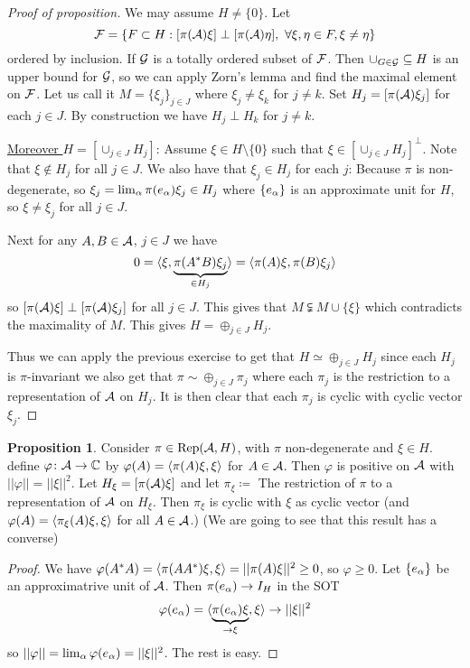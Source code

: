\documentclass[10pt,english,a4paper]{article}
\theoremstyle{definition}
\newtheorem*{proposition}{Proposition}
\DeclareMathOperator{\Rep}{Rep}
\def\vphi{\varphi}
\begin{document}
\begin{proof}[Proof of proposition]
    We may assume $H\neq \{0\}$. Let 
\[ \mathcal{F} = \{ F\subset H : [\pi(\mathcal{A})\xi] \perp [\pi(\mathcal{A})\eta], ~\forall \xi,\eta \in F, \xi\neq \eta\} \]
ordered by inclusion. If $\mathcal{G}$ is a totally ordered subset of $\mathcal{F}$. Then 
$\cup_{G \in \mathcal{G}} \subseteq H$ is an upper bound for $\mathcal{G}$, so we can apply 
Zorn's lemma and find the maximal element on $\mathcal{F}$. Let us call it 
$M  = \{\xi_j\}_{j\in J}$ where $\xi_j\neq \xi_k$ for $j\neq k$. Set
$H_j =[\pi(\mathcal{A})\xi_j]$ for each $j\in J$. By construction we have 
$H_j \perp H_k$ for $j\neq k$. 

\ul{Moreover $H = [\cup_{j\in J}H_j]$}: Assume $\xi \in H\setminus \{0\}$ such that 
$\xi \in [\cup_{j\in J}H_j]^{\perp}$. Note that $\xi \not\in H_j$ for all $j\in J$.
We also have that $\xi_j \in H_j$ for each $j$: Because $\pi$ is non-degenerate, so 
$\xi_j = \lim_{\alpha}\pi(e_{\alpha})\xi_j \in H_j$ where $\{e_{\alpha}\}$ is an approximate
unit for $H$, so $\xi\neq \xi_j$ for all $j\in J$.

Next for any $A,B \in \mathcal{A}$, $j\in J$ we have 
\[ 0 = \langle \xi,\underbrace{\pi(A^*B)\xi_j}_{\in H_j} \rangle = \left\langle \pi(A)\xi,\pi(B)\xi_j \right\rangle  \] 
so
$[\pi(\mathcal{A})\xi]\perp [\pi(\mathcal{A})\xi_j]$ for all $j\in J$. This gives that $M
\subsetneqq M \cup \{\xi\}$ which contradicts the maximality of $M$. This gives 
$H = \oplus_{j\in J} H_j$. 

Thus we
can apply the previous exercise to get that $H \simeq \oplus_{j\in J} H_j$
since each $H_j$ is $\pi$-invariant we also get that $\pi\sim \oplus_{j\in J}
\pi_j$ where each $\pi_j$ is the restriction to a representation of $\mathcal{A}$ on
$H_j$. It is then clear that each $\pi_j$ is cyclic with cyclic vector $\xi_j$.
\end{proof}

\begin{proposition}
    Consider $\pi \in \Rep(\As,H)$, with $\pi$ non-degenerate and $\xi \in H$.
define $\vphi\colon \As \to \C$ by $\vphi(A) = \ind{\pi(A)\xi,\xi}$ for $A\in
\mathcal{A}$. Then $\vphi$ is  positive on $\mathcal{A}$ with 
$||\vphi|| = ||\xi||^2$. Let $H_{\xi} = [\pi(\mathcal{A})\xi]$ and let 
$\pi_{\xi} \coloneqq $ The restriction of $\pi$ to a representation of $\mathcal{A}$ on 
$H_{\xi}$. Then $\pi_{\xi}$ is cyclic with $\xi$ as cyclic vector 
(and $\vphi(A) = \ind{\pi_{\xi}(A)\xi,\xi} $ for all $A \in \mathcal{A}$.)
(We are going to see that this result has a converse)
\end{proposition}
\begin{proof}
   We have 
$\vphi(A^*A) = \ind{\pi(AA^*)\xi,\xi} = ||\pi(A)\xi||^2 \geq 0$, so $\vphi\geq 0$.
Let $\{e_{\alpha}\}$ be an approximatrive unit of $\mathcal{A}$. Then 
$\pi(e_{\alpha}) \to I_{H}$ in the SOT
\begin{align*}
    \vphi(e_{\al}) = \indi{\ub{\pi(e_{\al})\xi}_{\to\xi},\xi}\to ||\xi||^2
\end{align*}
so $||\vphi|| = \lim_{\al}\vphi(e_{\al}) = ||\xi||^2$. The rest is easy. 
\end{proof}
\end{document}
